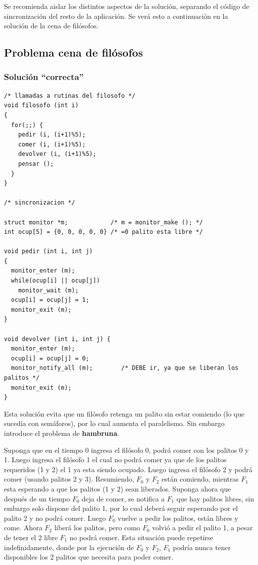 Se recomienda aislar los distintos aspectos de la solución, separando el código
de sincronización del resto de la aplicación. Se verá esto a continuación en la
solución de la cena de filósofos.

\subsection{Problema cena de filósofos}
\subsubsection{Solución ``correcta''}
\begin{lstlisting}
/* llamadas a rutinas del filosofo */
void filosofo (int i)
{
  for(;;) {
    pedir (i, (i+1)%5);
    comer (i, (i+1)%5);
    devolver (i, (i+1)%5);
    pensar ();
  }
}

/* sincronizacion */

struct monitor *m;            /* m = monitor_make (); */
int ocup[5] = {0, 0, 0, 0, 0} /* =0 palito esta libre */

void pedir (int i, int j)
{
  monitor_enter (m);
  while(ocup[i] || ocup[j])
    monitor_wait (m);
  ocup[i] = ocup[j] = 1;
  monitor_exit (m);
}

void devolver (int i, int j) {
  monitor_enter (m);
  ocup[i] = ocup[j] = 0;
  monitor_notify_all (m);        /* DEBE ir, ya que se liberan los palitos */
  monitor_exit (m);
}
\end{lstlisting}

Esta solución evita que un filósofo retenga un palito sin estar comiendo (lo que
sucedía con semáforos), por lo cual aumenta el paralelismo. Sin embargo
introduce el problema de \textbf{hambruna}.

Suponga que en el tiempo 0 ingresa el filósofo 0, podrá comer con los palitos 0
y 1. Luego ingresa el filósofo 1 el cual no podrá comer ya que de los palitos
requeridos (1 y 2) el 1 ya esta siendo ocupado. Luego ingresa el filósofo 2 y
podrá comer (usando palitos 2 y 3). Resumiendo, $F_0$ y $F_2$ están comiendo,
mientras $F_1$ esta esperando a que los palitos (1 y 2) sean liberados. Suponga
ahora que después de un tiempo $F_0$ deja de comer, se notifica a $F_1$ que hay
palitos libres, sin embargo solo dispone del palito 1, por lo cual deberá seguir
esperando por el palito 2 y no podrá comer. Luego $F_0$ vuelve a pedir los
palitos, están libres y come. Ahora $F_2$ liberá los palitos, pero como $F_0$
volvió a pedir el palito 1, a pesar de tener el 2 libre $F_1$ no podrá comer.
Esta situación puede repetirse indefinidamente, donde por la ejecución de $F_0$
y $F_2$, $F_1$ podría nunca tener disponibles los 2 palitos que necesita para
poder comer.

